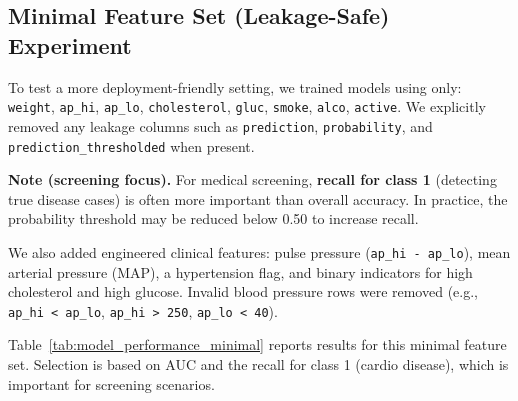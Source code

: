 \subsection{Minimal Feature Set (Leakage-Safe) Experiment}
To test a more deployment-friendly setting, we trained models using only: \texttt{weight}, \texttt{ap\_hi}, \texttt{ap\_lo}, \texttt{cholesterol}, \texttt{gluc}, \texttt{smoke}, \texttt{alco}, \texttt{active}. We explicitly removed any leakage columns such as \texttt{prediction}, \texttt{probability}, and \texttt{prediction\_thresholded} when present.

\begin{keyinsight}
\textbf{Note (screening focus).} For medical screening, \textbf{recall for class 1} (detecting true disease cases) is often more important than overall accuracy. In practice, the probability threshold may be reduced below 0.50 to increase recall.
\end{keyinsight}

We also added engineered clinical features: pulse pressure (\texttt{ap\_hi - ap\_lo}), mean arterial pressure (MAP), a hypertension flag, and binary indicators for high cholesterol and high glucose. Invalid blood pressure rows were removed (e.g., \texttt{ap\_hi < ap\_lo}, \texttt{ap\_hi > 250}, \texttt{ap\_lo < 40}).

Table~\ref{tab:model_performance_minimal} reports results for this minimal feature set. Selection is based on AUC and the recall for class 1 (cardio disease), which is important for screening scenarios.

\begin{table}[htbp]
\centering
\caption{Model performance using the minimal feature set with engineered features (leakage-safe).}
\label{tab:model_performance_minimal}
\scriptsize
{}%
\end{table}

